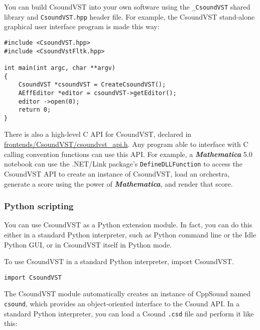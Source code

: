 \documentclass[10pt,letterpaper,onecolumn]{book}
\begin{document}
You can build CsoundVST into your own software using the \texttt{\_CsoundVST} shared library and \texttt{CsoundVST.hpp} header file. For example, the CsoundVST stand-alone graphical user interface program is made this way:

\begin{lstlisting}
#include <CsoundVST.hpp>
#include <CsoundVstFltk.hpp>

int main(int argc, char **argv)
{
    CsoundVST *csoundVST = CreateCsoundVST();
    AEffEditor *editor = csoundVST->getEditor();
    editor ->open(0);
    return 0;
}
\end{lstlisting}

There is also a high-level C API for CsoundVST, declared in \url{frontends/CsoundVST/csoundvst\_api.h}. Any program able to interface with C calling convention functions can use this API. For example, a \textbf{\emph{Mathematica}} 5.0 notebook can use the .NET/Link package's \texttt{DefineDLLFunction} to access the CsoundVST API to create an instance of CsoundVST, load an orchestra, generate a score using the power of \textbf{\emph{Mathematica}}, and render that score.

\subsubsection{Python scripting}

You can use CsoundVST as a Python extension module. In fact, you can do this either in a standard Python interpreter, such as Python command line or the Idle Python GUI, or in CsoundVST itself in Python mode.

To use CsoundVST in a standard Python interpreter, import CsoundVST.

\begin{lstlisting}
import CsoundVST
\end{lstlisting}

The CsoundVST module automatically creates an instance of CppSound named \texttt{csound}, which provides an object-oriented interface to the Csound API. In a standard Python interpreter, you can load a Csound \texttt{.csd} file and perform it like this: 
\end{document}
